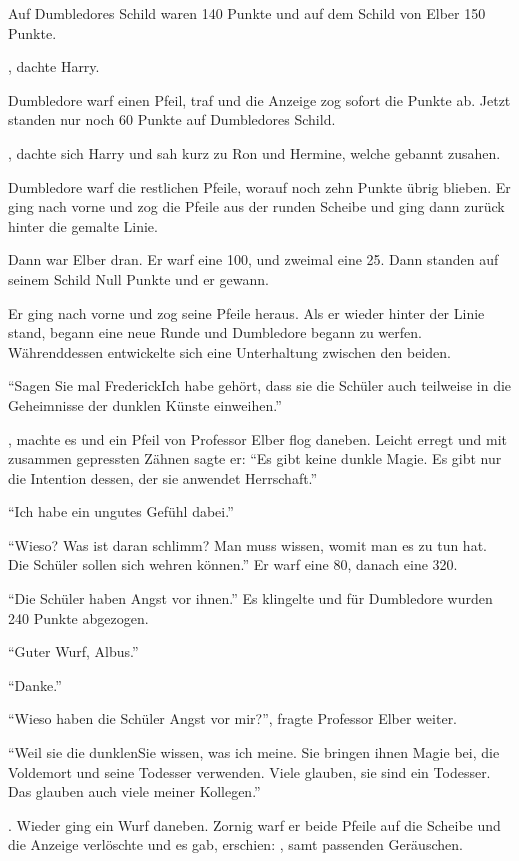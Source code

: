 Auf Dumbledores Schild waren 140 Punkte und auf dem Schild von Elber 150 Punkte.

, dachte Harry.

Dumbledore warf einen Pfeil, traf und die Anzeige zog sofort die Punkte ab. Jetzt standen nur noch 60 Punkte auf Dumbledores Schild.

, dachte sich Harry und sah kurz zu Ron und Hermine, welche gebannt zusahen.

Dumbledore warf die restlichen Pfeile, worauf noch zehn Punkte übrig blieben. Er ging nach vorne und zog die Pfeile aus der runden Scheibe und ging dann zurück hinter die gemalte Linie.

Dann war Elber dran. Er warf eine 100, und zweimal eine 25. Dann standen auf seinem Schild Null Punkte und er gewann.

Er ging nach vorne und zog seine Pfeile heraus. Als er wieder hinter der Linie stand, begann eine neue Runde und Dumbledore begann zu werfen. Währenddessen entwickelte sich eine Unterhaltung zwischen den beiden.

\enquote{Sagen Sie mal Frederick\abs Ich habe gehört, dass sie die Schüler auch teilweise in die Geheimnisse der dunklen Künste einweihen.}

, machte es und ein Pfeil von Professor Elber flog daneben. Leicht erregt und mit zusammen gepressten Zähnen sagte er: \enquote{Es gibt keine dunkle Magie. Es gibt nur die Intention dessen, der sie anwendet \gst Herrschaft.}

\enquote{Ich habe ein ungutes Gefühl dabei.}

\enquote{Wieso? Was ist daran schlimm? Man muss wissen, womit man es zu tun hat. Die Schüler sollen sich wehren können.} Er warf eine 80, danach eine 320.

\enquote{Die Schüler haben Angst vor ihnen.} Es klingelte und für Dumbledore wurden 240 Punkte abgezogen.

\enquote{Guter Wurf, Albus.}

\enquote{Danke.}

\enquote{Wieso haben die Schüler Angst vor mir?}, fragte Professor Elber weiter.

\enquote{Weil sie die dunklen\abs Sie wissen, was ich meine. Sie bringen ihnen Magie bei, die Voldemort und seine Todesser verwenden. Viele glauben, sie sind ein Todesser. Das glauben auch viele meiner Kollegen.}

. Wieder ging ein Wurf daneben. Zornig warf er beide Pfeile auf die Scheibe und die Anzeige verlöschte und es gab, erschien: , samt passenden Geräuschen.

